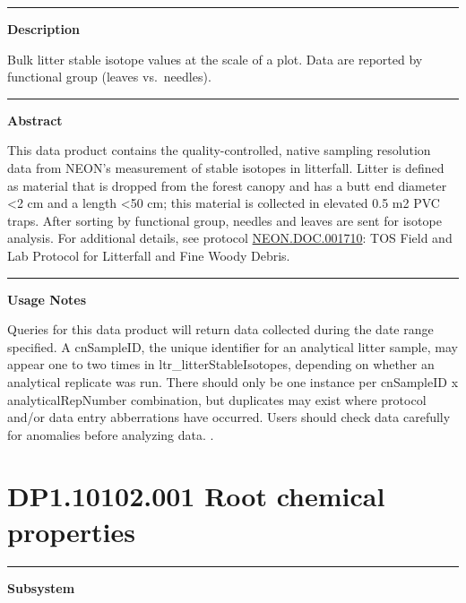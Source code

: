 \documentclass[]{article}
\begin{document}
\begin{center}\rule{0.5\linewidth}{\linethickness}\end{center}

\textbf{Description}

Bulk litter stable isotope values at the scale of a plot. Data are
reported by functional group (leaves vs.~needles).

\begin{center}\rule{0.5\linewidth}{\linethickness}\end{center}

\textbf{Abstract}

This data product contains the quality-controlled, native sampling
resolution data from NEON's measurement of stable isotopes in
litterfall. Litter is defined as material that is dropped from the
forest canopy and has a butt end diameter \textless{}2 cm and a length
\textless{}50 cm; this material is collected in elevated 0.5 m2 PVC
traps. After sorting by functional group, needles and leaves are sent
for isotope analysis. For additional details, see protocol
\href{http://data.neonscience.org/api/v0/documents/NEON.DOC.001710vE}{NEON.DOC.001710}:
TOS Field and Lab Protocol for Litterfall and Fine Woody Debris.

\begin{center}\rule{0.5\linewidth}{\linethickness}\end{center}

\textbf{Usage Notes}

Queries for this data product will return data collected during the date
range specified. A cnSampleID, the unique identifier for an analytical
litter sample, may appear one to two times in ltr\_litterStableIsotopes,
depending on whether an analytical replicate was run. There should only
be one instance per cnSampleID x analyticalRepNumber combination, but
duplicates may exist where protocol and/or data entry abberrations have
occurred. Users should check data carefully for anomalies before
analyzing data. \newpage
.

\section{DP1.10102.001 Root chemical
properties}\label{dp1.10102.001-root-chemical-properties}

\begin{center}\rule{0.5\linewidth}{\linethickness}\end{center}

\textbf{Subsystem}
\end{document}
